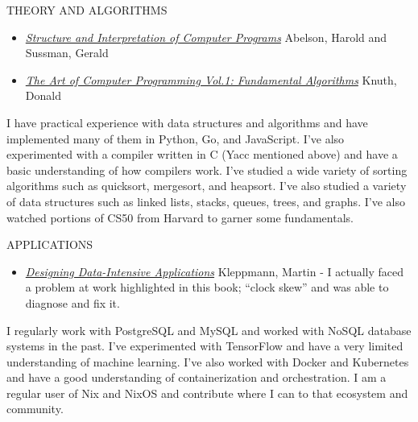 \documentclass[12pt]{report}
\begin{document}
THEORY AND ALGORITHMS
\begin{itemize}
        \item \href{https://en.wikipedia.org/wiki/Structure_and_Interpretation_of_Computer_Programs}{\emph {Structure and Interpretation of Computer Programs}} Abelson, Harold and Sussman, Gerald
        \item \href{https://www-cs-faculty.stanford.edu/~knuth/taocp.html}{\emph {The Art of Computer Programming Vol.1: Fundamental Algorithms}} Knuth, Donald
\end{itemize}
I have practical experience with data structures and algorithms and have implemented many of them in Python, Go, and JavaScript. I've also experimented  with a compiler written in C (Yacc mentioned above) and have a basic understanding of how compilers work. I've studied a wide variety of sorting algorithms such as quicksort, mergesort, and heapsort. I've also studied a variety of data structures such as linked lists, stacks, queues, trees, and graphs. I've also watched portions of CS50 from Harvard to garner some fundamentals.\hfill \break

APPLICATIONS
\begin{itemize}
        \item \href{https://dataintensive.net/}{\emph {Designing Data-Intensive Applications}} Kleppmann, Martin - I actually faced a problem at work highlighted in this book; ``clock skew'' and was able to diagnose and fix it.
\end{itemize}
I regularly work with PostgreSQL and MySQL and worked with NoSQL database systems in the past. I've experimented with TensorFlow and have a very limited understanding of machine learning. I've also worked with Docker and Kubernetes and have a good understanding of containerization and orchestration. I am a regular user of Nix and NixOS and contribute where I can to that ecosystem and community.\hfill \break
\end{document}
